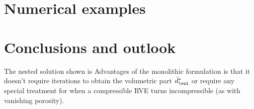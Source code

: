 \documentclass[a4paper,11pt]{article}
\begin{document}
\section{Numerical examples} \label{sec:numerical_examples}

\section{Conclusions and outlook} \label{sec:conclusions}
The nested solution shown is 
Advantages of the monolithic formulation is that it doesn't require iterations to obtain the volumetric part $\bar{d}_\vol^*$ or require any special treatment 
for when a compressible RVE turns incompressible (as with vanishing porosity).
\end{document}
